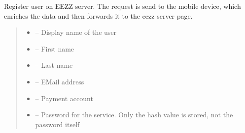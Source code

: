 \documentclass[letterpaper,10pt,english]{sphinxmanual}
\begin{document}
\begin{savenotes}
\begin{fulllineitems}
\begin{savenotes}
\begin{fulllineitems}
\end{fulllineitems}\end{savenotes}


\begin{savenotes}\begin{fulllineitems}
\label{\detokenize{eezz:eezz.session.TSession.register_user}}
\pysigstartsignatures
{}
\pysigstopsignatures
\sphinxAtStartPar
Register user on EEZZ server. The request is send to the mobile device, which enriches the data and then
forwards it to the eezz server page.
\begin{quote}\begin{description}
\begin{itemize}
\item {} 
\sphinxAtStartPar
{} – Display name of the user

\item {} 
\sphinxAtStartPar
{} – First name

\item {} 
\sphinxAtStartPar
{} – Last name

\item {} 
\sphinxAtStartPar
{} – E\sphinxhyphen{}Mail address

\item {} 
\sphinxAtStartPar
{} – Payment account

\item {} 
\sphinxAtStartPar
{} – Password for the service. Only the hash value is stored, not the password itself


\end{itemize}
\end{description}
\end{quote}
\end{fulllineitems}
\end{savenotes}
\end{fulllineitems}
\end{savenotes}
\end{document}
